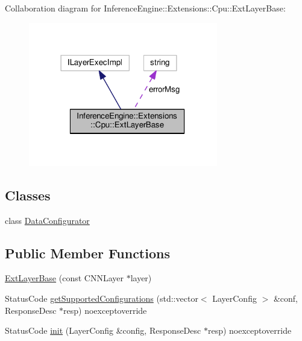 Collaboration diagram for Inference\+Engine\+:\+:Extensions\+:\+:Cpu\+:\+:Ext\+Layer\+Base\+:
\nopagebreak
\begin{figure}[H]
\begin{center}
\leavevmode
\includegraphics[width=234pt]{classInferenceEngine_1_1Extensions_1_1Cpu_1_1ExtLayerBase__coll__graph}
\end{center}
\end{figure}
\subsection*{Classes}
\begin{DoxyCompactItemize}
\item 
class \hyperlink{classInferenceEngine_1_1Extensions_1_1Cpu_1_1ExtLayerBase_1_1DataConfigurator}{Data\+Configurator}
\end{DoxyCompactItemize}
\subsection*{Public Member Functions}
\begin{DoxyCompactItemize}
\item 
\hyperlink{classInferenceEngine_1_1Extensions_1_1Cpu_1_1ExtLayerBase_affff0e8263ca26852ccf71d299d7b06a}{Ext\+Layer\+Base} (const C\+N\+N\+Layer $\ast$layer)
\item 
Status\+Code \hyperlink{classInferenceEngine_1_1Extensions_1_1Cpu_1_1ExtLayerBase_a1dae3d7d80ed72136ff298b90a5af266}{get\+Supported\+Configurations} (std\+::vector$<$ Layer\+Config $>$ \&conf, Response\+Desc $\ast$resp) noexceptoverride
\item 
Status\+Code \hyperlink{classInferenceEngine_1_1Extensions_1_1Cpu_1_1ExtLayerBase_a6323eec85cc894aa9ee19ae2b7443efb}{init} (Layer\+Config \&config, Response\+Desc $\ast$resp) noexceptoverride
\end{DoxyCompactItemize}
